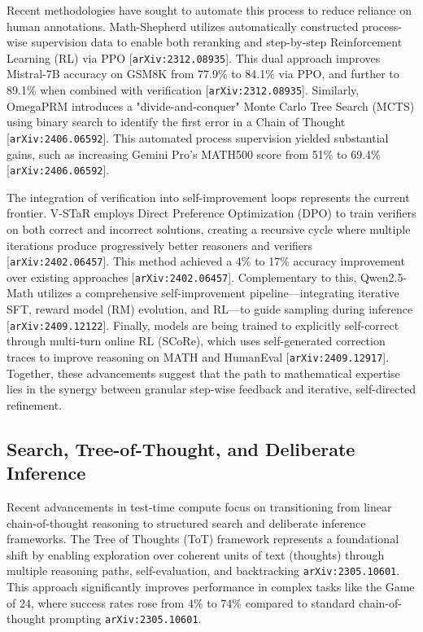 \documentclass[11pt]{article}
\begin{document}
Recent methodologies have sought to automate this process to reduce reliance on human annotations. Math-Shepherd utilizes automatically constructed process-wise supervision data to enable both reranking and step-by-step Reinforcement Learning (RL) via PPO [\texttt{arXiv:2312.08935}]. This dual approach improves Mistral-7B accuracy on GSM8K from 77.9\% to 84.1\% via PPO, and further to 89.1\% when combined with verification [\texttt{arXiv:2312.08935}]. Similarly, OmegaPRM introduces a "divide-and-conquer" Monte Carlo Tree Search (MCTS) using binary search to identify the first error in a Chain of Thought [\texttt{arXiv:2406.06592}]. This automated process supervision yielded substantial gains, such as increasing Gemini Pro's MATH500 score from 51\% to 69.4\% [\texttt{arXiv:2406.06592}].

The integration of verification into self-improvement loops represents the current frontier. V-STaR employs Direct Preference Optimization (DPO) to train verifiers on both correct and incorrect solutions, creating a recursive cycle where multiple iterations produce progressively better reasoners and verifiers [\texttt{arXiv:2402.06457}]. This method achieved a 4\% to 17\% accuracy improvement over existing approaches [\texttt{arXiv:2402.06457}]. Complementary to this, Qwen2.5-Math utilizes a comprehensive self-improvement pipeline—integrating iterative SFT, reward model (RM) evolution, and RL—to guide sampling during inference [\texttt{arXiv:2409.12122}]. Finally, models are being trained to explicitly self-correct through multi-turn online RL (SCoRe), which uses self-generated correction traces to improve reasoning on MATH and HumanEval [\texttt{arXiv:2409.12917}]. Together, these advancements suggest that the path to mathematical expertise lies in the synergy between granular step-wise feedback and iterative, self-directed refinement.

\subsection{Search, Tree-of-Thought, and Deliberate Inference}

Recent advancements in test-time compute focus on transitioning from linear chain-of-thought reasoning to structured search and deliberate inference frameworks. The Tree of Thoughts (ToT) framework represents a foundational shift by enabling exploration over coherent units of text (thoughts) through multiple reasoning paths, self-evaluation, and backtracking \texttt{arXiv:2305.10601}. This approach significantly improves performance in complex tasks like the Game of 24, where success rates rose from 4\% to 74\% compared to standard chain-of-thought prompting \texttt{arXiv:2305.10601}.
\end{document}
